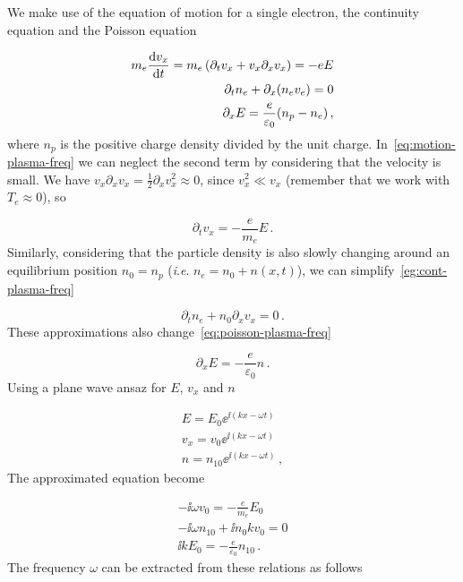 \documentclass[12pt, class=report, crop=false]{standalone}
\begin{document}
We make use of the equation of motion for a single electron, the continuity equation and the Poisson equation

\begin{subequations}
  \begin{align}
    \label{eq:motion-plasma-freq}
    m_e \dv{v_x}{t} = m_e \left(\partial_t v_x + v_x \partial_x v_x\right) = -e E\\
    \label{eg:cont-plasma-freq}
    \partial_t n_e + \partial_x (n_e v_e) = 0\\
    \label{eq:poisson-plasma-freq}
    \partial_x E = \frac{e}{\varepsilon_0} (n_p - n_e)\,,
  \end{align}
\end{subequations}
where \(n_p\) is the positive charge density divided by the unit charge. In~\cref{eq:motion-plasma-freq} we can neglect the second term by considering that the velocity is small. We have \(v_x \partial_x v_x = \frac{1}{2} \partial_x v_x^2 \approx 0\), since \(v_x^2\ll v_x\) (remember that we work with \(T_e\approx0\)), so

\begin{equation}
  \partial_t v_x = - \frac{e}{m_e} E\,.
\end{equation}
Similarly, considering that the particle density is also slowly changing around an equilibrium position \(n_0 = n_p\) (\textit{i}.\textit{e}. \(n_e = n_0 +n(x,t)\)), we can simplify~\cref{eg:cont-plasma-freq}

\begin{equation}
  \partial_t n_e + n_0 \partial_x v_x = 0\,.
\end{equation}
These approximations also change~\cref{eq:poisson-plasma-freq}

\begin{equation}
  \partial_x E = - \frac{e}{\varepsilon_0} n\,.
\end{equation}
Using a plane wave ansaz for \(E\), \(v_x\) and \(n\)

\begin{subequations}
  \begin{align}
    E = E_0 \ee^{\ii(kx -\omega t)}\\
    v_x = v_0 \ee^{\ii(kx -\omega t)}\\
    n = n_{10} \ee^{\ii(kx -\omega t)}\,,
  \end{align}
\end{subequations}
The approximated equation become

\begin{subequations}
  \begin{align}
    -\ii\omega v_0 = - \frac{e}{m_e} E_0\\
    - \ii \omega n_{10} +\ii n_0 k v_0 = 0\\
    \ii k E_0 = - \frac{e}{\varepsilon_0} n_{10}\,.
  \end{align}
\end{subequations}
The frequency \(\omega\) can be extracted from these relations as follows
\end{document}
